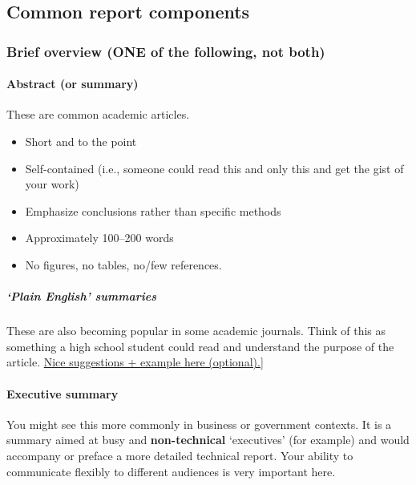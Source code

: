 \documentclass[
  openany]{book}
\providecommand{\tightlist}{%
  \setlength{\itemsep}{0pt}\setlength{\parskip}{0pt}}
\begin{document}
\hypertarget{common-report-components}{%
\subsection{Common report components}\label{common-report-components}}

\hypertarget{brief-overview-one-of-the-following-not-both}{%
\subsubsection{Brief overview (ONE of the following, not both)}\label{brief-overview-one-of-the-following-not-both}}

\hypertarget{abstract-or-summary}{%
\paragraph{Abstract (or summary)}\label{abstract-or-summary}}

These are common academic articles.

\begin{itemize}
\tightlist
\item
  Short and to the point
\item
  Self-contained (i.e., someone could read this and only this and get the gist of your work)
\item
  Emphasize conclusions rather than specific methods
\item
  Approximately 100--200 words
\item
  No figures, no tables, no/few references.
\end{itemize}

\hypertarget{plain-english-summaries}{%
\subparagraph{`Plain English' summaries}\label{plain-english-summaries}}

These are also becoming popular in some academic journals. Think of this as something a high school student could read and understand the purpose of the article. \href{https://www.agu.org/-/media/Files/Share-and-Advocate-for-Science/Toolkit---PLS.pdf}{Nice suggestions + example here (optional).}{]}

\hypertarget{executive-summary}{%
\paragraph{Executive summary}\label{executive-summary}}

You might see this more commonly in business or government contexts. It is a summary aimed at busy and \textbf{non-technical} `executives' (for example) and would accompany or preface a more detailed technical report. Your ability to communicate flexibly to different audiences is very important here.
\end{document}
